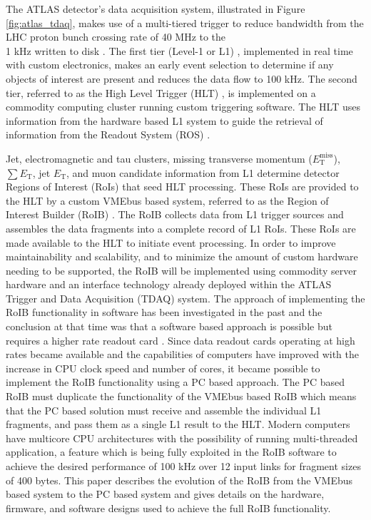 The ATLAS \cite{atlas} detector's data acquisition system, illustrated in Figure \ref{fig:atlas_tdaq}, makes use of a multi-tiered trigger to reduce 
bandwidth from the LHC proton bunch crossing rate of 40 MHz
to the \\1 kHz written to disk \cite{evolution}. The first tier (Level-1 or L1) \cite{l1}, implemented in real time with custom electronics, 
makes an early event selection to determine if any objects of interest are present and reduces the data flow to 
100 kHz. The second tier, referred to as the High Level Trigger (HLT) \cite{hlt}, is implemented on a commodity computing cluster running custom triggering software. The HLT uses information from the
hardware based L1 system to guide the retrieval of information from the Readout System (ROS) \cite{ros}. 

Jet, electromagnetic and tau clusters, missing transverse momentum ($E_{\mathrm{T}}^{\mathrm{miss}}$), $\sum E_{\mathrm{T}}$, 
jet $E_{\mathrm{T}}$, and muon candidate information from L1 determine detector Regions of Interest (RoIs) that seed HLT processing. These RoIs are provided to the HLT by a custom VMEbus based system, referred to as the Region of Interest Builder (RoIB) \cite{vme_roib}.
The RoIB collects data from L1 
trigger sources and assembles the data fragments into a complete record of L1 RoIs. These RoIs are made available to the HLT to initiate event processing. In order to improve maintainability and scalability, and to minimize the amount of custom hardware needing to be supported, 
the RoIB will be implemented using commodity server hardware and an interface technology already deployed 
within the ATLAS Trigger and Data Acquisition (TDAQ) system. The approach of implementing the RoIB functionality in software has been investigated in the past 
and the conclusion at that time was that a software based approach is possible but requires a higher rate readout card \cite{swroib_past}. 
Since data readout cards operating at high rates became available and the capabilities of computers have improved with the increase 
in CPU clock speed and number of cores, it became possible to implement the RoIB functionality using a PC based approach. 
The PC based RoIB must duplicate the functionality of the VMEbus based RoIB which means that the PC based solution must receive and assemble the
individual L1 fragments, and pass them as a single L1 result to the HLT. Modern computers have multicore CPU architectures 
with the possibility of running multi-threaded application, a feature which is being fully exploited in the RoIB software to achieve 
the desired performance of 100 kHz over 12 input links for fragment sizes of 400 bytes.  
This paper describes the evolution of the RoIB from the VMEbus based system to the PC based system and gives details on the hardware, 
firmware, and software designs used to achieve the full RoIB functionality. 



